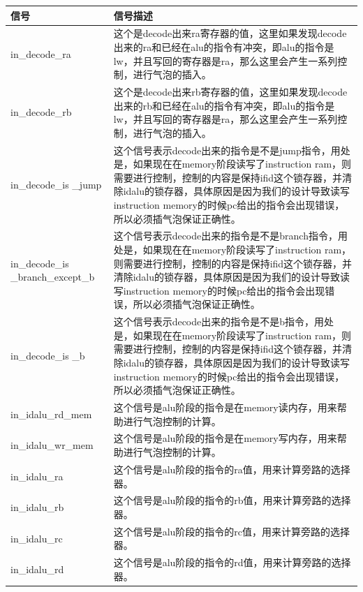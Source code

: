 \begin{center}
    \label{table:center_controllor}
    \begin{longtable}{p{}p{}}
        \toprule
        信号 & 信号描述 \\
        \midrule
            in\_decode\_ra & 这个是decode出来ra寄存器的值，这里如果发现decode出来的ra和已经在alu的指令有冲突，即alu的指令是lw，并且写回的寄存器是ra，那么这里会产生一系列控制，进行气泡的插入。\\
            in\_decode\_rb & 这个是decode出来rb寄存器的值，这里如果发现decode出来的rb和已经在alu的指令有冲突，即alu的指令是lw，并且写回的寄存器是ra，那么这里会产生一系列控制，进行气泡的插入。\\
            in\_decode\_is  \_jump & 这个信号表示decode出来的指令是不是jump指令，用处是，如果现在在memory阶段读写了instruction ram，则需要进行控制，控制的内容是保持ifid这个锁存器，并清除idalu的锁存器，具体原因是因为我们的设计导致读写instruction memory的时候pc给出的指令会出现错误，所以必须插气泡保证正确性。\\
            in\_decode\_is  \_branch\_except\_b & 这个信号表示decode出来的指令是不是branch指令，用处是，如果现在在memory阶段读写了instruction ram，则需要进行控制，控制的内容是保持ifid这个锁存器，并清除idalu的锁存器，具体原因是因为我们的设计导致读写instruction memory的时候pc给出的指令会出现错误，所以必须插气泡保证正确性。\\
            in\_decode\_is  \_b & 这个信号表示decode出来的指令是不是b指令，用处是，如果现在在memory阶段读写了instruction ram，则需要进行控制，控制的内容是保持ifid这个锁存器，并清除idalu的锁存器，具体原因是因为我们的设计导致读写instruction memory的时候pc给出的指令会出现错误，所以必须插气泡保证正确性。\\
            in\_idalu\_rd\_mem & 这个信号是alu阶段的指令是在memory读内存，用来帮助进行气泡控制的计算。\\
            in\_idalu\_wr\_mem & 这个信号是alu阶段的指令是在memory写内存，用来帮助进行气泡控制的计算。\\
            in\_idalu\_ra & 这个信号是alu阶段的指令的ra值，用来计算旁路的选择器。\\
            in\_idalu\_rb & 这个信号是alu阶段的指令的rb值，用来计算旁路的选择器。\\
            in\_idalu\_rc & 这个信号是alu阶段的指令的rc值，用来计算旁路的选择器。\\
            in\_idalu\_rd & 这个信号是alu阶段的指令的rd值，用来计算旁路的选择器。\\

\end{longtable}
\end{center}
